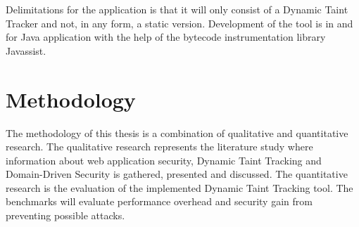 Delimitations for the application is that it will only consist of a Dynamic Taint Tracker and not, in any form, a static version. Development of the tool is in and for Java application with the help of the bytecode instrumentation library Javassist.



\section{Methodology}
\label{Methodology}
The methodology of this thesis is a combination of qualitative and quantitative research. The qualitative research represents the literature study where information about web application security, Dynamic Taint Tracking and Domain-Driven Security is gathered, presented and discussed. The quantitative research is the evaluation of the implemented Dynamic Taint Tracking tool. The benchmarks will evaluate performance overhead and security gain from preventing possible attacks.
